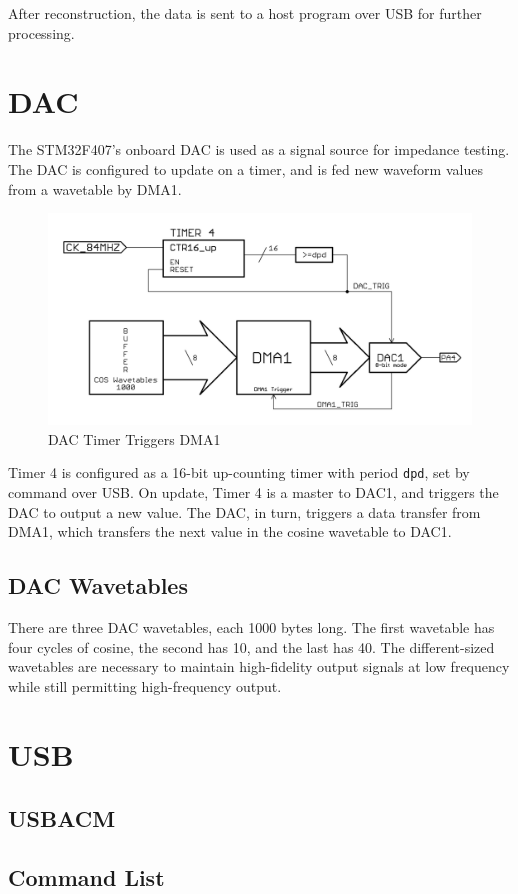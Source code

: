 After reconstruction, the data is sent to a host program over USB for further processing.

\section{DAC}

The STM32F407's onboard DAC is used as a signal source for impedance testing.
The DAC is configured to update on a timer, and is fed new waveform values from a wavetable by DMA1.

\begin{figure}[H]
  \begin{center}
      \includegraphics[width=1\textwidth]{../DAC-DMA.png}
      \caption{DAC Timer Triggers DMA1}
  \end{center}
\end{figure}


Timer 4 is configured as a 16-bit up-counting timer with period \texttt{dpd}, set by command over USB.
On update, Timer 4 is a master to DAC1, and triggers the DAC to output a new value.
The DAC, in turn, triggers a data transfer from DMA1, which transfers the next value in the cosine wavetable to DAC1.


\subsection{DAC Wavetables}

There are three DAC wavetables, each 1000 bytes long.
The first wavetable has four cycles of cosine, the second has 10, and the last has 40.
The different-sized wavetables are necessary to maintain high-fidelity output signals at low frequency while still permitting high-frequency output.

\section{USB}


\subsection{USBACM}


\subsection{Command List}
%